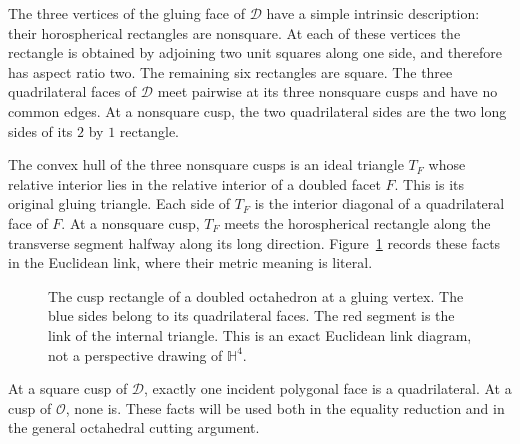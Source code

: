 \documentclass[11pt]{article}
\theoremstyle{remark}
\newcommand{\HH}{\mathbb H}
\newcommand{\OCT}{\mathcal O}
\newcommand{\DBL}{\mathcal D}
\begin{document}
The three vertices of the gluing face of $\DBL$ have a simple
intrinsic description: their horospherical rectangles are nonsquare.
At each of these vertices the rectangle is obtained by adjoining
two unit squares along one side, and therefore has aspect ratio two.
The remaining six rectangles are square. The three quadrilateral
faces of $\DBL$ meet pairwise at its three nonsquare cusps and have
no common edges. At a nonsquare cusp, the two quadrilateral sides
are the two long sides of its $2$ by $1$ rectangle.

The convex hull of the three nonsquare cusps is an ideal triangle
$T_F$ whose relative interior lies in the relative interior of a
doubled facet $F$. This is its
original gluing triangle. Each side of $T_F$ is the interior diagonal
of a quadrilateral face of $F$. At a nonsquare cusp, $T_F$ meets
the horospherical rectangle along the transverse segment halfway
along its long direction. Figure~\ref{fig:rectangle} records these
facts in the Euclidean link, where their metric meaning is literal.

\begin{figure}[htbp]
\centering
{}
\caption{The cusp rectangle of a doubled octahedron at a gluing
vertex. The blue sides belong to its quadrilateral faces. The red
segment is the link of the internal triangle. This is an exact
Euclidean link diagram, not a perspective drawing of $\HH^4$.}
\label{fig:rectangle}
\end{figure}

At a square cusp of $\DBL$, exactly one incident polygonal face
is a quadrilateral. At a cusp of $\OCT$, none is. These facts will be used both in the equality reduction and in the
general octahedral cutting argument.
\end{document}
